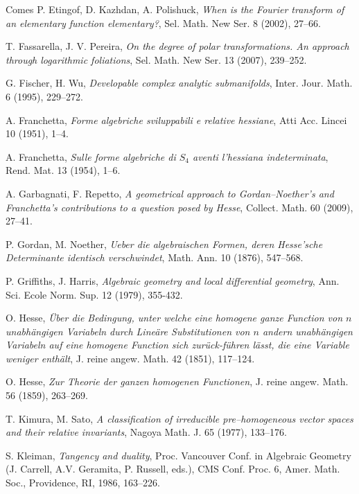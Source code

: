 \documentclass[11pt]{article}   %
\theoremstyle{definition}
\numberwithin{Theorem}{section} \numberwithin{equation}{section}
\begin{document}
{{\begin{thebibliography}{Comes}
 P. Etingof, D. Kazhdan, A. Polishuck, {\it When is the
Fourier transform of an elementary function elementary?}, Sel. Math. New Ser. 8 (2002), 27--66.

 T. Fassarella, J. V. Pereira, {\it On the degree of polar transformations. An approach through logarithmic foliations}, Sel. Math. New Ser.  13 (2007),  239--252.

 G. Fischer, H. Wu, {\it Developable complex
analytic submanifolds}, Inter. Jour. Math. 6 (1995), 229--272.


 A. Franchetta, {\it Forme algebriche
sviluppabili e relative hessiane}, Atti Acc. Lincei  10 (1951),
1--4.

 A. Franchetta, {\it Sulle forme algebriche
di $S_4$ aventi l'hessiana indeterminata}, Rend. Mat.  13
(1954), 1--6.

 A. Garbagnati, F. Repetto, {\it A geometrical approach to
Gordan--Noether's and Franchetta's contributions to a question posed by Hesse},
Collect. Math. 60 (2009), 27--41.


 P. Gordan, M. Noether,
{\it Ueber die algebraischen Formen, deren Hesse'sche Determinante
identisch verschwindet}, Math. Ann.  10 (1876), 547--568.

 P. Griffiths, J. Harris, {\it Algebraic geometry and
local differential geometry}, Ann. Sci. Ecole Norm. Sup. 12
(1979), 355-432.


 O. Hesse, {\it \"Uber die Bedingung, unter
welche eine homogene ganze Function von $n$ unabh\"angigen Variabeln
durch Line\"are Substitutionen von $n$ andern unabh\"angigen
Variabeln auf eine homogene Function sich zur\"uck-f\"uhren l\"asst,
die eine Variable weniger enth\"alt},
 J. reine angew. Math.  42 (1851), 117--124.

 O. Hesse, {\it
Zur Theorie der ganzen homogenen Functionen}, J. reine angew. Math.
 56 (1859), 263--269.


  T. Kimura, M. Sato, {\it A classification of
irreducible pre--homogeneous vector spaces and their relative
invariants}, Nagoya Math. J. 65 (1977), 133--176.

 S. Kleiman, {\it Tangency and duality}, Proc.
Vancouver Conf. in Algebraic Geometry (J. Carrell, A.V. Geramita, P.
Russell, eds.), CMS Conf. Proc. 6, Amer. Math. Soc.,  Providence, RI, 1986,
163--226.


\end{thebibliography}}}
\end{document}
